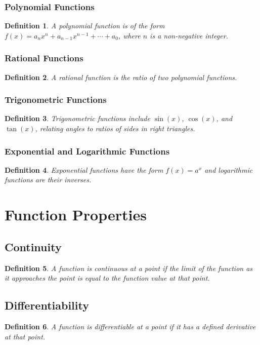 \documentclass[a4paper,12pt]{book}
\newtheorem{definition}{Definition}
\begin{document}
\subsubsection{Polynomial Functions}
\begin{definition}
A polynomial function is of the form \( f(x) = a_nx^n + a_{n-1}x^{n-1} + \cdots + a_0 \), where \( n \) is a non-negative integer.
\end{definition}

\subsubsection{Rational Functions}
\begin{definition}
A rational function is the ratio of two polynomial functions.
\end{definition}

\subsubsection{Trigonometric Functions}
\begin{definition}
Trigonometric functions include \( \sin(x) \), \( \cos(x) \), and \( \tan(x) \), relating angles to ratios of sides in right triangles.
\end{definition}

\subsubsection{Exponential and Logarithmic Functions}
\begin{definition}
Exponential functions have the form \( f(x) = a^x \) and logarithmic functions are their inverses.
\end{definition}

\section{Function Properties}
\subsection{Continuity}
\begin{definition}
A function is continuous at a point if the limit of the function as it approaches the point is equal to the function value at that point.
\end{definition}

\subsection{Differentiability}
\begin{definition}
A function is differentiable at a point if it has a defined derivative at that point.
\end{definition}
\end{document}
